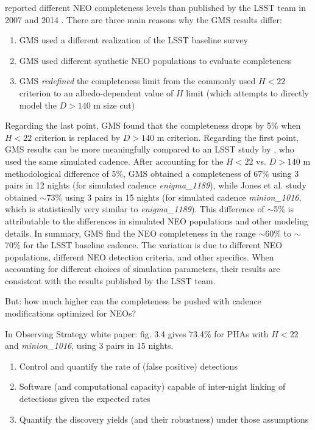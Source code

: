 \documentclass[12pt,preprint]{aastex}
\begin{document}
\cite[hereafter GMS]{GMS2016} reported different NEO completeness levels than
published by the LSST team in 2007 and 2014 . There are three main 
reasons why the GMS results differ:
\begin{enumerate}
\item GMS used a different realization of the LSST baseline survey
\item GMS used different synthetic NEO populations to evaluate completeness
\item GMS {\it redefined} the completeness limit from the commonly
  used $H<22$ criterion to an albedo-dependent value of $H$ limit (which
  attempts to directly model the $D>140$ m size cut)
\end{enumerate}

Regarding the last point, GMS found that the completeness drops by 5\%
when $H<22$ criterion is replaced by $D>140$ m criterion. Regarding 
the first point, GMS results can be more meaningfully compared to an LSST
study by \cite{JJI2016}, who used the same simulated cadence. After accounting for 
the $H<22$ vs. $D>140$ m methodological difference of 5\%, GMS obtained a 
completeness of 67\% using 3 pairs in 12 nights (for simulated cadence {\it enigma\_1189}), while Jones et al. 
study obtained $\sim$73\% using 3 pairs in 15 nights (for simulated cadence {\it minion\_1016}, which is 
statistically very similar to {\it enigma\_1189}). This difference 
of $\sim$5\% is attributable to the differences in simulated NEO
populations and other modeling details. In summary, GMS find the NEO
completeness in the range $\sim$60\% to $\sim$70\% for the LSST
baseline cadence. The variation is due to different NEO populations,
different NEO detection criteria, and other specifics. When accounting 
for different choices of simulation parameters, their results are
consistent with the results published by the LSST team. 

But: how much higher can the completeness be pushed with cadence
modifications optimized for NEOs? 

In Observing Strategy white paper: fig. 3.4 gives 73.4\% for PHAs with 
$H<22$ and {\it minion\_1016}, using 3 pairs in 15 nights. 


\begin{enumerate} 
\item Control and quantify the rate of (false positive) detections
\item Software (and computational capacity) capable of inter-night linking of detections given the expected rates
\item Quantify the discovery yields (and their robustness) under those assumptions
\end{enumerate} 
\end{document}
